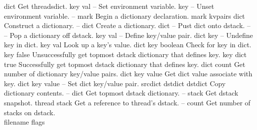 \begin{longtable}{}
	{dict}
	{Get threadsdict.}
\hline
\optableent
	{key val}
	{{\bf {}}}
	{--}
	{Set environment variable.}
\hline
\optableent
	{key}
	{{\bf {}}}
	{--}
	{Unset environment variable.}
\hline
\optableent
	{--}
	{{\bf {}}}
	{mark}
	{Begin a dictionary declaration.}
\hline
\optableent
	{mark kvpairs}
	{{\bf {}}}
	{dict}
	{Construct a dictionary.}
\hline
\optableent
	{--}
	{{\bf {}}}
	{dict}
	{Create a dictionary.}
\hline
\optableent
	{dict}
	{{\bf {}}}
	{--}
	{Pust dict onto dstack.}
\hline
\optableent
	{--}
	{{\bf {}}}
	{--}
	{Pop a dictionary off dstack.}
\hline
\optableent
	{key val}
	{{\bf {}}}
	{--}
	{Define key/value pair.}
\hline
\optableent
	{dict key}
	{{\bf {}}}
	{--}
	{Undefine key in dict.}
\hline
\optableent
	{key}
	{{\bf {}}}
	{val}
	{Look up a key's value.}
\hline
\optableent
	{dict key}
	{{\bf {}}}
	{boolean}
	{Check for key in dict.}
\hline
\optableent
	{key}
	{{\bf {}}}
	{false}
	{Unsuccessfully get topmost dstack dictionary that defines key.}
\hline
\optableent
	{key}
	{{\bf {}}}
	{dict true}
	{Successfully get topmost dstack dictionary that defines key.}
\hline
\optableent
	{dict}
	{{\bf {}}}
	{count}
	{Get number of dictionary key/value pairs.}
\hline
\optableent
	{dict key}
	{{\bf {}}}
	{value}
	{Get dict value associate with key.}
\hline
\optableent
	{dict key value}
	{{\bf {}}}
	{--}
	{Set dict key/value pair.}
\hline
\optableent
	{srcdict dstdict}
	{{\bf {}}}
	{dstdict}
	{Copy dictionary contents.}
\hline
\optableent
	{--}
	{{\bf {}}}
	{dict}
	{Get topmost dstack dictionary.}
\hline
\optableent
	{--}
	{{\bf {}}}
	{stack}
	{Get dstack snapshot.}
\hline
\optableent
	{thread}
	{{\bf {}}}
	{stack}
	{Get a reference to thread's dstack.}
\hline
\optableent
	{--}
	{{\bf {}}}
	{count}
	{Get number of stacks on dstack.}
\hline \hline
{} \\
\hline \hline
\optableent
	{filename flags}
	{{\bf {}}}

\end{longtable}
